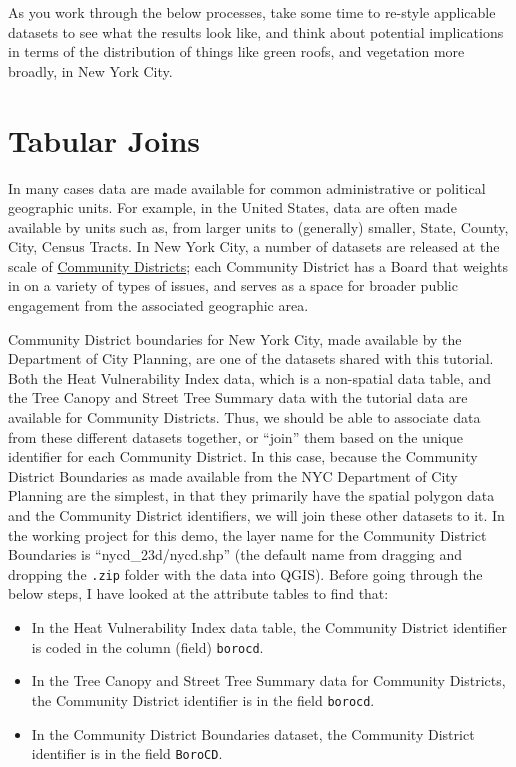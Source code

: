 \documentclass[
  letterpaper,
  DIV=11,
  numbers=noendperiod]{scrreprt}
\providecommand{\tightlist}{%
  \setlength{\itemsep}{0pt}\setlength{\parskip}{0pt}}\usepackage{longtable,booktabs,array}
\begin{document}
As you work through the below processes, take some time to re-style
applicable datasets to see what the results look like, and think about
potential implications in terms of the distribution of things like green
roofs, and vegetation more broadly, in New York City.

\hypertarget{tabular-joins}{%
\section{Tabular Joins}\label{tabular-joins}}

In many cases data are made available for common administrative or
political geographic units. For example, in the United States, data are
often made available by units such as, from larger units to (generally)
smaller, State, County, City, Census Tracts. In New York City, a number
of datasets are released at the scale of
\href{https://www.nyc.gov/site/planning/community/community-portal.page}{Community
Districts}; each Community District has a Board that weights in on a
variety of types of issues, and serves as a space for broader public
engagement from the associated geographic area.

Community District boundaries for New York City, made available by the
Department of City Planning, are one of the datasets shared with this
tutorial. Both the Heat Vulnerability Index data, which is a non-spatial
data table, and the Tree Canopy and Street Tree Summary data with the
tutorial data are available for Community Districts. Thus, we should be
able to associate data from these different datasets together, or
``join'' them based on the unique identifier for each Community
District. In this case, because the Community District Boundaries as
made available from the NYC Department of City Planning are the
simplest, in that they primarily have the spatial polygon data and the
Community District identifiers, we will join these other datasets to it.
In the working project for this demo, the layer name for the Community
District Boundaries is ``nycd\_23d/nycd.shp'' (the default name from
dragging and dropping the \texttt{.zip} folder with the data into QGIS).
Before going through the below steps, I have looked at the attribute
tables to find that:

\begin{itemize}
\tightlist
\item
  In the Heat Vulnerability Index data table, the Community District
  identifier is coded in the column (field) \texttt{borocd}.
\item
  In the Tree Canopy and Street Tree Summary data for Community
  Districts, the Community District identifier is in the field
  \texttt{borocd}.
\item
  In the Community District Boundaries dataset, the Community District
  identifier is in the field \texttt{BoroCD}.
\end{itemize}
\end{document}
